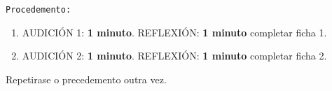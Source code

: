 %
\begin{instruccions}

\begin{center}
\texttt{Procedemento:}    
\end{center}
\begin{enumerate}
    \item
    AUDICIÓN 1: \textbf{1 minuto}. 
    REFLEXIÓN: \textbf{1 minuto} completar ficha 1.
    \item 
    AUDICIÓN 2: \textbf{1 minuto}. 
    REFLEXIÓN: \textbf{1 minuto} completar ficha 2.
\end{enumerate}
\begin{center}
    Repetirase o precedemento outra vez.
\end{center} 
\end{instruccions}
\vspace*{0.15cm}
